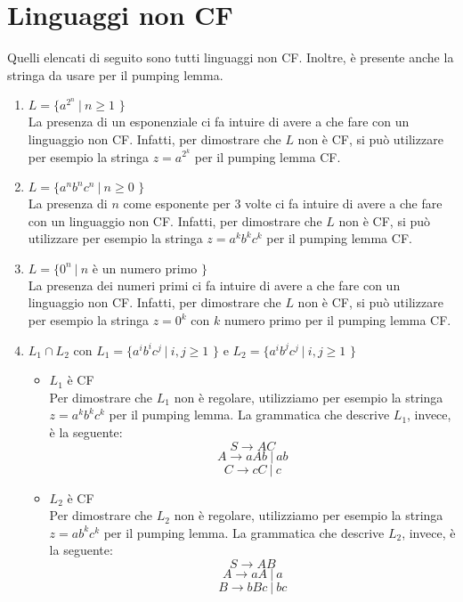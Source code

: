 \documentclass[a4paper,oneside,titlepage]{book}
\begin{document}
\section{Linguaggi non CF}
Quelli elencati di seguito sono tutti linguaggi non CF. Inoltre, è presente anche la stringa da usare per il pumping lemma.
\begin{enumerate}[label=\fbox{\arabic*}]
\item $L = \text{\{ } a^{2^n} \ | \  n \geq 1 \text{ \}}$
\\ La presenza di un esponenziale ci fa intuire di avere a che fare con un linguaggio non CF. Infatti, per dimostrare che $L$ non è CF, si può utilizzare per esempio la stringa $z = a^{2^k}$ per il pumping lemma CF.

\item $L = \text{\{ } a^n b^n c^n \ | \  n \geq 0 \text{ \}}$
\\ La presenza di $n$ come esponente per 3 volte ci fa intuire di avere a che fare con un linguaggio non CF. Infatti, per dimostrare che $L$ non è CF, si può utilizzare per esempio la stringa $z = a^k b^k c^k$ per il pumping lemma CF.

\item $L = \text{\{ } 0^n \ | \  n \text{ è un numero primo \}}$
\\ La presenza dei numeri primi ci fa intuire di avere a che fare con un linguaggio non CF. Infatti, per dimostrare che $L$ non è CF, si può utilizzare per esempio la stringa $z = 0^k$ con $k$ numero primo per il pumping lemma CF.

\item $L_1 \cap L_2$ con $L_1 = \text{\{ } a^i b^i c^j \ | \  i,j \geq 1 \text{ \}}$ e $L_2 = \text{\{ } a^i b^j c^j \ | \  i,j \geq 1 \text{ \}}$
\begin{itemize}
\item $L_1$ è CF
\\ Per dimostrare che $L_1$ non è regolare, utilizziamo per esempio la stringa $z = a^k b^k c^k$ per il pumping lemma. La grammatica che descrive $L_1$, invece, è la seguente:
\[ S \longrightarrow AC \]
\[ A \longrightarrow aAb \ | \ ab \]
\[ C \longrightarrow cC \ | \ c \]

\item $L_2$ è CF
\\ Per dimostrare che $L_2$ non è regolare, utilizziamo per esempio la stringa $z = a b^k c^k$ per il pumping lemma. La grammatica che descrive $L_2$, invece, è la seguente:
\[ S \longrightarrow AB \]
\[ A \longrightarrow aA \ | \ a \]
\[ B \longrightarrow bBc \ | \ bc \]


\end{itemize}
\end{enumerate}
\end{document}
